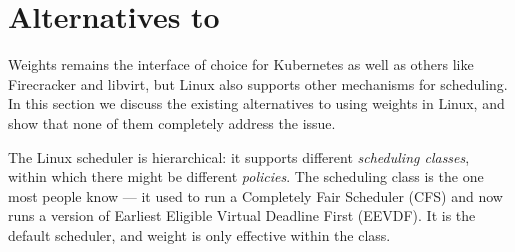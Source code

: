 \section{Alternatives to \cgroups{}}\label{s:alternatives}

Weights remains the \cgroups{} interface of choice for Kubernetes as well as
others like Firecracker and libvirt, but Linux also supports other mechanisms
for scheduling. In this section we discuss the existing alternatives to using
\cgroups{} weights in Linux, and show that none of them completely address the
issue.

The Linux scheduler is hierarchical: it supports different \textit{scheduling
classes}, within which there might be different \textit{policies}. The
\normalclass{} scheduling class is the one most people know --- it used to run a
Completely Fair Scheduler (CFS) and now runs a version of Earliest Eligible
Virtual Deadline First (EEVDF). It is the default scheduler, and \cgroups{}
weight is only effective within the \normalclass{} class.

\subsection{\schedidle{}}

